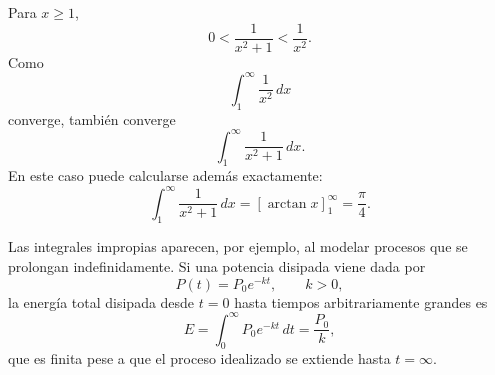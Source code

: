 \begin{example}
Para $x\geq1$,
\[
0<\frac{1}{x^2+1}<\frac{1}{x^2}.
\]
Como
\[
\int_1^{\infty}\frac{1}{x^2}\,dx
\]
converge, también converge
\[
\int_1^{\infty}\frac{1}{x^2+1}\,dx.
\]
En este caso puede calcularse además exactamente:
\[
\int_1^{\infty}\frac{1}{x^2+1}\,dx
=
\left[\arctan x\right]_1^{\infty}
=
\frac{\pi}{4}.
\]
\end{example}

Las integrales impropias aparecen, por ejemplo, al modelar procesos que se prolongan indefinidamente. Si una potencia disipada viene dada por
\[
P(t)=P_0e^{-kt},\qquad k>0,
\]
la energía total disipada desde $t=0$ hasta tiempos arbitrariamente grandes es
\[
E=\int_0^{\infty}P_0e^{-kt}\,dt
=\frac{P_0}{k},
\]
que es finita pese a que el proceso idealizado se extiende hasta $t=\infty$.

